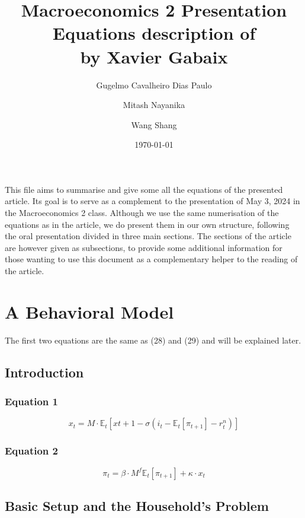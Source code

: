 \documentclass{article}
\title{Macroeconomics 2 Presentation \\ Equations description of \\ \textquote{A Behavioral New Keynesian Model} by Xavier Gabaix}
\author{Gugelmo Cavalheiro Dias Paulo \\ \and Mitash Nayanika \\ \and Wang Shang}
\date{\today}
\begin{document}
\maketitle

This file aims to summarise and give some all the equations of the presented article. Its goal is to serve as a complement to the presentation of May 3, 2024 in the Macroeconomics 2 class. 
Although we use the same numerisation of the equations as in the article, we do present them in our own structure, following the oral presentation divided in three main sections. 
The sections of the article are however given as subsections, to provide some additional information for those wanting to use this document as a complementary helper to the reading of the article.

\pagebreak
\tableofcontents
\pagebreak

\section{A Behavioral Model}
The first two equations are the same as (28) and (29) and will be explained later.

\subsection{Introduction}

\subsubsection*{Equation 1}
\begin{equation}
    x_{t}=M\cdot\mathbb{E}_{t}\left[ x{t+1} -\sigma (i_{t}-\mathbb{E}_{t}\left[\pi_{t+1}\right]-r^{n}_{t})\right]
\end{equation}

\subsubsection*{Equation 2}
\begin{equation}
    \pi_{t}=\beta\cdot M^{f} \mathbb{E}_{t}\left[\pi_{t+1}\right]+\kappa\cdot x_{t}
\end{equation}

\subsection{Basic Setup and the Household’s Problem}
\end{document}
